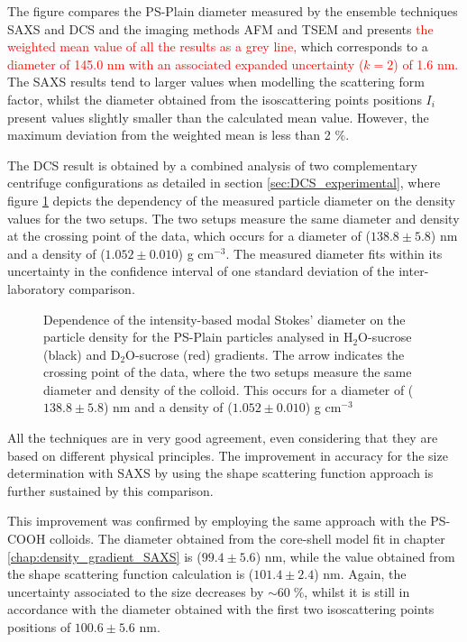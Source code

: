 The figure compares the PS-Plain diameter measured by the ensemble techniques SAXS and DCS and the imaging methods AFM and TSEM and presents \textcolor{red}{the weighted mean value of all the results as a grey line,} which corresponds to a \textcolor{red}{diameter of 145.0 nm with an associated expanded uncertainty ($k=2$) of 1.6 nm.} The SAXS results tend to larger values when modelling the scattering form factor, whilst the diameter obtained from the isoscattering points positions $I_i$ present values slightly smaller than the calculated mean value. However, the maximum deviation from the weighted mean is less than 2 $\%$.

The DCS result is obtained by a combined analysis of two complementary centrifuge configurations as detailed in section \ref{sec:DCS_experimental}, where figure \ref{fig:DCSCombinedStokes} depicts the dependency of the measured particle diameter on the density values for the two setups. The two setups measure the same diameter and density at the crossing point of the data, which occurs for a diameter of ($138.8\pm5.8$) nm and a density of ($1.052\pm0.010$) g cm$^{-3}$. The measured diameter fits within its uncertainty in the confidence interval of one standard deviation of the inter-laboratory comparison.

\begin{figure}
	\begin{center}
		
	\end{center}
	\caption[Simultaneous size and density determination of the PS-Plain particles with a DCS combined approach.]{Dependence of the intensity-based modal Stokes' diameter on the particle density for the PS-Plain particles analysed in H$_2$O-sucrose (black) and D$_2$O-sucrose (red) gradients. The arrow indicates the crossing point of the data, where the two setups measure the same diameter and density of the colloid. This occurs for a diameter of ($138.8\pm5.8$) nm and a density of ($1.052\pm0.010$) g cm$^{-3}$}
	\label{fig:DCSCombinedStokes}
\end{figure}

All the techniques are in very good agreement, even considering that they are based on different physical principles. The improvement in accuracy for the size determination with SAXS by using the shape scattering function approach is further sustained by this comparison. 

This improvement was confirmed by employing the same approach with the PS-COOH colloids. The diameter obtained from the core-shell model fit in chapter \ref{chap:density_gradient_SAXS} is ($99.4\pm5.6$) nm, while the value obtained from the shape scattering function calculation is ($101.4\pm2.4$) nm. Again, the uncertainty associated to the size decreases by $\sim 60\;\%$, whilst it is still in accordance with the diameter obtained with the first two isoscattering points positions of $100.6\pm 5.6$ nm.

